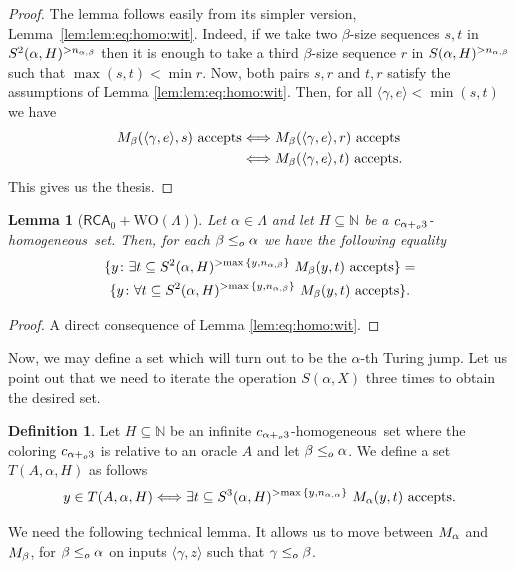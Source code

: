 \documentclass[11pt]{amsart}
\newtheorem{lemma}[thm]{Lemma}
\theoremstyle{definition}
\newtheorem{definition}[thm]{Definition}
\theoremstyle{remark}
\theoremstyle{plain}
\def\la{\langle}
\def\ra{\rangle}
\newcommand{\numberset}{\mathbb}
\newcommand{\N}{\numberset{N}}
\def\a{\alpha}
\def\b{\beta}
\newcommand{\RCA}{\mathsf{RCA}_0}
\newcommand{\set}[1]{{\{{#1}\}}}
\def\WO{{\textrm{WO}}}
\newcommand{\leqo}{\leq\sb{o}}
\newcommand{\pluso}{+\sb{o}}
\def\N{{\mathbb{N}}}
\newcommand{\homo}{homogeneous}
\def\ifff{\Longleftrightarrow}
\begin{document}
\begin{proof}
The lemma follows easily from its simpler version, Lemma~\ref{lem:lem:eq:homo:wit}.
Indeed, if we take two $\beta$-size sequences $s,t$ in $S\sp2(\alpha,H) \sp{>n_{\a,\b}}$ then it is enough to take a third $\beta$-size sequence $r$ in $S(\alpha,H)\sp{>n_{\a,\b}}$ such that $\max(s,t)<\min r$. 
Now, both pairs $s, r$ and $t, r$ 
satisfy the assumptions of Lemma \ref{lem:lem:eq:homo:wit}. 
Then, for all $\la\gamma,e\ra<\min(s,t)$
we have
\begin{align*}
M\sb\beta(\langle\gamma,e\rangle,s)\mbox{ accepts}& \ifff M\sb\beta(\langle\gamma,e\rangle,r)\mbox{ accepts}\\
&\ifff M\sb\beta(\langle\gamma,e\rangle,t)\mbox{ accepts}.
\end{align*}
This gives us the thesis.
\end{proof}

\begin{lemma}[$\RCA+\WO(\Lambda)$]\label{lem:homo:wit:delta1}
Let $\alpha\in\Lambda$ and let $H \subseteq \N$ be a $c\sb{\alpha\pluso3}$-\homo\ set. 
Then, for each $\beta\leqo\alpha$ we have the following equality
\begin{multline*}
\set{y\colon \exists t \subseteq S\sp2(\alpha,H)\sp{>\max \set{y,n_{\a,\b}}}\ M\sb\beta(y,t)\mbox{ accepts}}= \\
\set{y\colon \forall t \subseteq S\sp2(\alpha,H)\sp{>\max \set{y,n_{\a,\b}}}\ M\sb\beta(y,t)\mbox{ accepts}}.
\end{multline*}
\end{lemma}

\begin{proof}
A direct consequence of Lemma \ref{lem:eq:homo:wit}.
\end{proof}

Now, we may define a set which will turn out to be the $\alpha$-th Turing jump.
Let us point out that we need to iterate the operation $S(\alpha,X)$ three times to obtain the desired set. 

\begin{definition}
Let $H\subseteq\N$ be an infinite $c\sb{\alpha \pluso3}$-\homo\ set where the coloring $c\sb{\alpha\pluso3}$ is relative to an oracle $A$ and let $\beta\leqo\alpha$.
We define a set $T(A,\alpha,H)$ as follows
$$
y\in T(A,\alpha,H) \ifff
\exists t \subseteq S\sp3(\alpha,H)\sp{>\max \set{y,n_{\a,\a}}}\ M\sb\alpha(y,t)\mbox{ accepts}.
$$ 
\end{definition}

We need the following technical lemma.
It allows us to move between $M\sb\alpha$ and $M\sb\beta$, for $\beta \leqo \alpha$ on inputs $\la \gamma,z \ra$ such that $\gamma\leqo\beta$.
\end{document}
